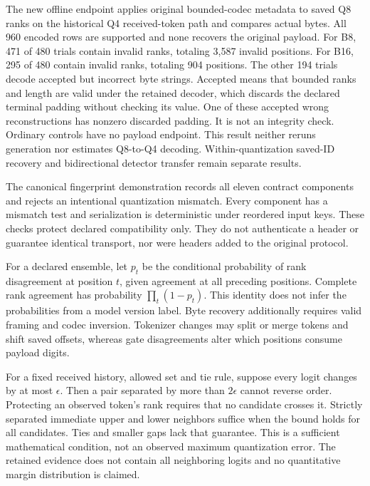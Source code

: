 The new offline endpoint applies original bounded-codec metadata to saved Q8 ranks on the historical Q4 received-token path and compares actual bytes. All 960 encoded rows are supported and none recovers the original payload. For B8, 471 of 480 trials contain invalid ranks, totaling 3,587 invalid positions. For B16, 295 of 480 contain invalid ranks, totaling 904 positions. The other 194 trials decode accepted but incorrect byte strings. Accepted means that bounded ranks and length are valid under the retained decoder, which discards the declared terminal padding without checking its value. One of these accepted wrong reconstructions has nonzero discarded padding. It is not an integrity check. Ordinary controls have no payload endpoint. This result neither reruns generation nor estimates Q8-to-Q4 decoding. Within-quantization saved-ID recovery and bidirectional detector transfer remain separate results.

\label{si:v4-theory}
The canonical fingerprint demonstration records all eleven contract components and rejects an intentional quantization mismatch. Every component has a mismatch test and serialization is deterministic under reordered input keys. These checks protect declared compatibility only. They do not authenticate a header or guarantee identical transport, nor were headers added to the original protocol.

For a declared ensemble, let \(p_t\) be the conditional probability of rank disagreement at position \(t\), given agreement at all preceding positions. Complete rank agreement has probability \(\prod_t(1-p_t)\). This identity does not infer the probabilities from a model version label. Byte recovery additionally requires valid framing and codec inversion. Tokenizer changes may split or merge tokens and shift saved offsets, whereas gate disagreements alter which positions consume payload digits.

For a fixed received history, allowed set and tie rule, suppose every logit changes by at most \(\epsilon\). Then a pair separated by more than \(2\epsilon\) cannot reverse order. Protecting an observed token's rank requires that no candidate crosses it. Strictly separated immediate upper and lower neighbors suffice when the bound holds for all candidates. Ties and smaller gaps lack that guarantee. This is a sufficient mathematical condition, not an observed maximum quantization error. The retained evidence does not contain all neighboring logits and no quantitative margin distribution is claimed.

